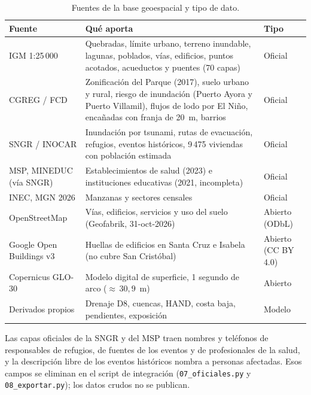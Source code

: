 \documentclass{sosg-informe}
\begin{document}
\begin{table}[ht]
  \centering\small
  \caption{Fuentes de la base geoespacial y tipo de dato.}
  \label{tab:fuentes}
  \begin{tabularx}{\linewidth}{>{\raggedright\arraybackslash}p{3.1cm}>{\raggedright\arraybackslash}Xl}
    \toprule
    Fuente & Qué aporta & Tipo \\
    \midrule
    IGM 1:25\,000 & Quebradas, límite urbano, terreno inundable, lagunas, poblados, vías, edificios, puntos acotados, acueductos y puentes (70 capas) & Oficial \\
    CGREG / FCD & Zonificación del Parque (2017), suelo urbano y rural, riesgo de inundación (Puerto Ayora y Puerto Villamil), flujos de lodo por El Niño, encañadas con franja de 20~m, barrios & Oficial \\
    SNGR / INOCAR & Inundación por tsunami, rutas de evacuación, refugios, eventos históricos, 9\,475 viviendas con población estimada & Oficial \\
    MSP, MINEDUC (vía SNGR) & Establecimientos de salud (2023) e instituciones educativas (2021, incompleta) & Oficial \\
    INEC, MGN 2026 & Manzanas y sectores censales & Oficial \\
    OpenStreetMap & Vías, edificios, servicios y uso del suelo (Geofabrik, 31-oct-2026) & Abierto (ODbL) \\
    Google Open Buildings v3 & Huellas de edificios en Santa Cruz e Isabela (no cubre San Cristóbal) & Abierto (CC BY 4.0) \\
    Copernicus GLO-30 & Modelo digital de superficie, 1 segundo de arco (${\approx}\,30{,}9$~m) & Abierto \\
    Derivados propios & Drenaje D8, cuencas, HAND, costa baja, pendientes, exposición & Modelo \\
    \bottomrule
  \end{tabularx}
\end{table}

Las capas oficiales de la SNGR y del MSP traen nombres y teléfonos de responsables de refugios, de fuentes de los eventos y de profesionales de la salud, y la descripción libre de los eventos históricos nombra a personas afectadas. Esos campos se eliminan en el script de integración (\texttt{07\_oficiales.py} y \texttt{08\_exportar.py}); los datos crudos no se publican.
\end{document}
